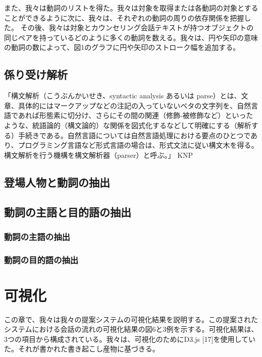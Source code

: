\documentclass[shuuron]{kuee}
\begin{document}
  また、我々は動詞のリストを得た。我々は対象を取得または各動詞の対象とすることができるように次に、我々は、それぞれの動詞の周りの依存関係を把握した。
  その後、我々は対象とカウンセリング会話テキストが持つオブジェクトの同じペアを持っているどのように多くの動詞を数える。我々は、円や矢印の意味の動詞の数によって、図1のグラフに円や矢印のストローク幅を追加する。


  \subsection{係り受け解析}


「構文解析（こうぶんかいせき、syntactic analysis あるいは parse）とは、文章、具体的にはマークアップなどの注記の入っていないベタの文字列を、自然言語であれば形態素に切分け、さらにその間の関連（修飾-被修飾など）といったような、統語論的（構文論的）な関係を図式化するなどして明確にする（解析する）手続きである。自然言語については自然言語処理における要点のひとつであり、プログラミング言語など形式言語の場合は、形式文法に従い構文木を得る。構文解析を行う機構を構文解析器（parser）と呼ぶ。」
  KNP


  \subsection{登場人物と動詞の抽出}


  \subsection{動詞の主語と目的語の抽出}

\subsubsection{動詞の主語の抽出}
\subsubsection{動詞の目的語の抽出}



\section{可視化}

この章で、我々は我々の提案システムの可視化結果を説明する。この提案されたシステムにおける会話の流れの可視化結果の図6と3例を示する。可視化結果は、3つの項目から構成されている。我々は、可視化のためにD3.js [17]を使用していた。それが書かれた書き起こし産物に基づきる。
\end{document}
